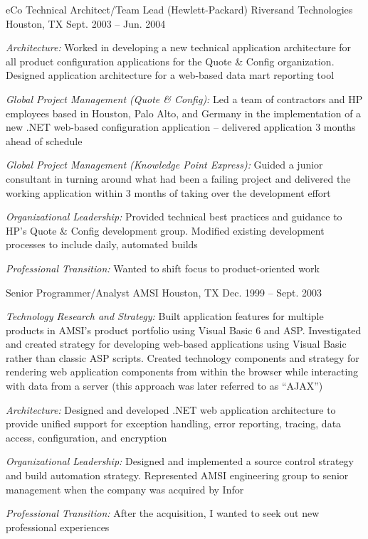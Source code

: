 \begin{cventries}

\cventry 
{eCo Technical Architect/Team Lead (Hewlett-Packard)}
{Riversand Technologies}
{Houston, TX}
{Sept. 2003 – Jun. 2004}
{ %
\begin{cvitems}
\item {\emph{Architecture:} Worked in developing a new technical application architecture for all product configuration applications for the Quote \& Config organization. Designed application architecture for a web-based data mart reporting tool }
\item {\emph{Global Project Management (Quote \& Config):} Led a team of contractors and HP employees based in Houston, Palo Alto, and Germany in the implementation of a new .NET web-based configuration application – delivered application 3 months ahead of schedule }
\item {\emph{Global Project Management (Knowledge Point Express):} Guided a junior consultant in turning around what had been a failing project and delivered the working application within 3 months of taking over the development effort }
\item {\emph{Organizational Leadership:} Provided technical best practices and guidance to HP's Quote \& Config development group. Modified existing development processes to include daily, automated builds }
\item {\emph{Professional Transition:} Wanted to shift focus to product-oriented work }
\end{cvitems}
}


\cventry 
{Senior Programmer/Analyst}
{AMSI}
{Houston, TX}
{Dec. 1999 – Sept. 2003}
{ %
\begin{cvitems}
\item {\emph{Technology Research and Strategy:} Built application features for multiple products in AMSI’s product portfolio using Visual Basic 6 and ASP. Investigated and created strategy for developing web-based applications using Visual Basic rather than classic ASP scripts. Created technology components and strategy for rendering web application components from within the browser while interacting with data from a server (this approach was later referred to as “AJAX”) }
\item {\emph{Architecture:} Designed and developed .NET web application architecture to provide unified support for exception handling, error reporting, tracing, data access, configuration, and encryption }
\item {\emph{Organizational Leadership:} Designed and implemented a source control strategy and build automation strategy. Represented AMSI engineering group to senior management when the company was acquired by Infor }
\item {\emph{Professional Transition:} After the acquisition, I wanted to seek out new professional experiences }
\end{cvitems}
}


\end{cventries}